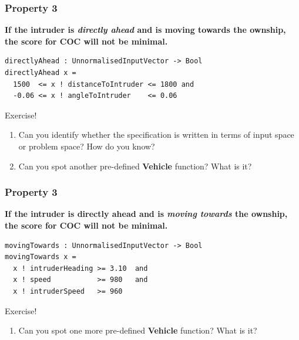 \documentclass[aspectratio=169]{beamer}
\begin{document}
\begin{frame}[fragile]
\frametitle{Property 3}


\footnotesize{\textbf{If the intruder is \emph{directly ahead} and is moving towards the
 ownship, the score for COC will not be minimal.}}

\pause

\begin{verbatim}
directlyAhead : UnnormalisedInputVector -> Bool
directlyAhead x =
  1500  <= x ! distanceToIntruder <= 1800 and
  -0.06 <= x ! angleToIntruder    <= 0.06
\end{verbatim}
\pause
\begin{block}{Exercise!}
\footnotesize{
\begin{enumerate}
\item
Can you identify whether the specification is written in terms of input space or problem space? How do you know?
\item Can you spot another pre-defined \textbf{Vehicle} function? What is it?
\end{enumerate}}
\end{block}

\end{frame}




\begin{frame}[fragile]
\frametitle{Property 3}

\footnotesize{\textbf{If the intruder is directly ahead and is \emph{moving towards} the
 ownship, the score for COC will not be minimal.}}

\pause

\begin{verbatim}
movingTowards : UnnormalisedInputVector -> Bool
movingTowards x =
  x ! intruderHeading >= 3.10  and
  x ! speed           >= 980   and
  x ! intruderSpeed   >= 960
\end{verbatim}
\pause
\begin{block}{Exercise!}
\footnotesize{
\begin{enumerate}
\item Can you spot one more pre-defined \textbf{Vehicle} function? What is it?
\end{enumerate}}
\end{block}

\end{frame}
\end{document}
